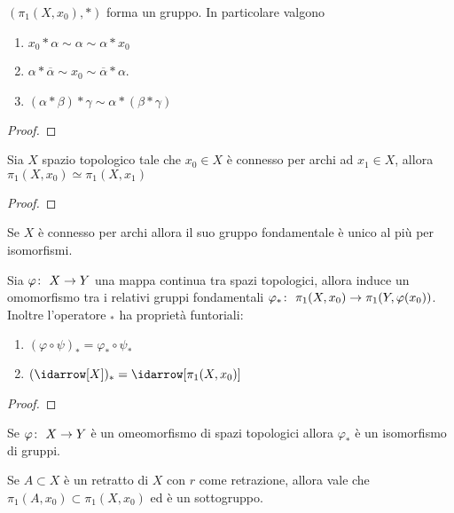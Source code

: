 \begin{theorem}
	$(\pi_1(X, x_0), *)$ forma un gruppo. In particolare valgono
	\begin{enumerate}
		\item $x_0 * \alpha \sim \alpha \sim \alpha * x_0$
		\item $\alpha * \overline{\alpha} \sim x_0 \sim \overline{\alpha} * \alpha$.
		\item $(\alpha * \beta) * \gamma \sim \alpha * (\beta * \gamma)$
	\end{enumerate} 
\end{theorem}
\begin{proof}
\end{proof}

\begin{theorem}
	Sia $X$ spazio topologico tale che $x_0 \in X$ è connesso per archi ad $x_1 \in X$, allora $\pi_1(X, x_0) \simeq \pi_1(X, x_1)$
\end{theorem}
\begin{proof}
	
\end{proof}

\begin{corollary}
	Se $X$ è connesso per archi allora il suo gruppo fondamentale è unico al più per isomorfismi.
\end{corollary}
	
	
\begin{theorem}
	Sia $\varphi \colon\ X \rightarrow Y$ una mappa continua tra spazi topologici, allora induce un omomorfismo tra i relativi gruppi fondamentali $\varphi_* \colon\ \pi_1(X, x_0) \rightarrow \pi_1(Y, \varphi(x_0))$. Inoltre l'operatore $_*$ ha proprietà funtoriali:
	\begin{enumerate}
		\item $(\varphi \circ \psi)_* = \varphi_* \circ \psi_*$
		\item $(\idarrow[X])_* = \idarrow[\pi_1(X, x_0)]$ 
	\end{enumerate}
\end{theorem}
\begin{proof}
\end{proof}

\begin{corollary}
	Se $\varphi \colon\ X \rightarrow Y$ è un omeomorfismo di spazi topologici allora $\varphi_*$ è un isomorfismo di gruppi. 
\end{corollary}

\begin{theorem}
	Se $A \subset X$ è un retratto di $X$ con $r$ come retrazione, allora vale che $\pi_1(A, x_0) \subset \pi_1(X, x_0)$ ed è un sottogruppo.  
\end{theorem}
	

